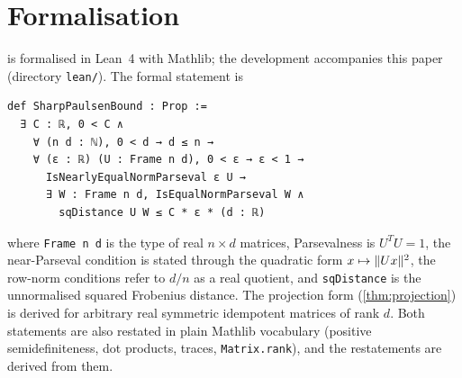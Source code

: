 \section{Formalisation}\label{app:formal}

 is formalised in Lean~4 with Mathlib; the development
accompanies this paper (directory \texttt{lean/}). The formal statement is
\begin{center}
\begin{minipage}{0.92\textwidth}
\small
\begin{verbatim}
def SharpPaulsenBound : Prop :=
  ∃ C : ℝ, 0 < C ∧
    ∀ (n d : ℕ), 0 < d → d ≤ n →
    ∀ (ε : ℝ) (U : Frame n d), 0 < ε → ε < 1 →
      IsNearlyEqualNormParseval ε U →
      ∃ W : Frame n d, IsEqualNormParseval W ∧
        sqDistance U W ≤ C * ε * (d : ℝ)
\end{verbatim}
\end{minipage}
\end{center}
where \texttt{Frame n d} is the type of real $n\times d$ matrices, Parsevalness
is $U^TU=1$, the near-Parseval condition is stated through the quadratic form
$x\mapsto\lVert Ux\rVert^2$, the row-norm conditions refer to $d/n$ as a real
quotient, and \texttt{sqDistance} is the unnormalised squared Frobenius
distance. The projection form (\cref{thm:projection}) is derived for arbitrary
real symmetric idempotent matrices of rank $d$. Both statements are also
restated in plain Mathlib vocabulary (positive semidefiniteness, dot products,
traces, \texttt{Matrix.rank}), and the restatements are derived from them.

